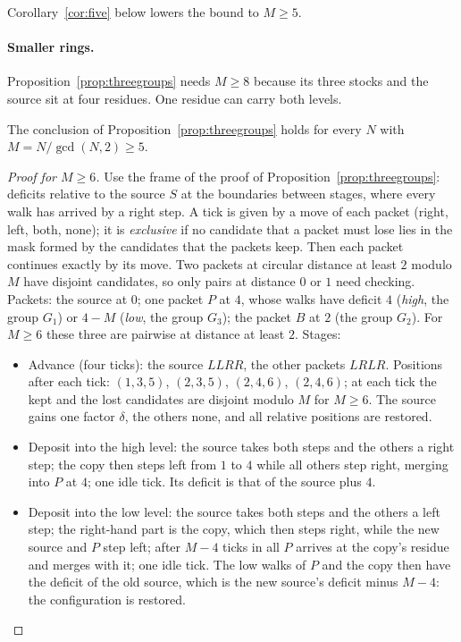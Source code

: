 Corollary~\ref{cor:five} below lowers the bound to $M\ge5$.

\paragraph{Smaller rings.} Proposition~\ref{prop:threegroups} needs $M\ge8$ because its three stocks and the source sit at four residues. One residue can carry both levels.

\begin{proposition}\label{prop:threegroups5}
The conclusion of Proposition~\ref{prop:threegroups} holds for every $N$ with $M=N/\gcd(N,2)\ge5$.
\end{proposition}
\begin{proof}[Proof for $M\ge6$]
Use the frame of the proof of Proposition~\ref{prop:threegroups}: deficits relative to the source $S$ at the boundaries between stages, where every walk has arrived by a right step. A tick is given by a move of each packet (right, left, both, none); it is \emph{exclusive} if no candidate that a packet must lose lies in the mask formed by the candidates that the packets keep. Then each packet continues exactly by its move. Two packets at circular distance at least $2$ modulo $M$ have disjoint candidates, so only pairs at distance $0$ or $1$ need checking. Packets: the source at $0$; one packet $P$ at $4$, whose walks have deficit $4$ (\emph{high}, the group $G_1$) or $4-M$ (\emph{low}, the group $G_3$); the packet $B$ at $2$ (the group $G_2$). For $M\ge6$ these three are pairwise at distance at least $2$. Stages:
\begin{itemize}
\item Advance (four ticks): the source $LLRR$, the other packets $LRLR$. Positions after each tick: $(1,3,5)$, $(2,3,5)$, $(2,4,6)$, $(2,4,6)$; at each tick the kept and the lost candidates are disjoint modulo $M$ for $M\ge6$. The source gains one factor $\delta$, the others none, and all relative positions are restored.
\item Deposit into the high level: the source takes both steps and the others a right step; the copy then steps left from $1$ to $4$ while all others step right, merging into $P$ at $4$; one idle tick. Its deficit is that of the source plus $4$.
\item Deposit into the low level: the source takes both steps and the others a left step; the right-hand part is the copy, which then steps right, while the new source and $P$ step left; after $M-4$ ticks in all $P$ arrives at the copy's residue and merges with it; one idle tick. The low walks of $P$ and the copy then have the deficit of the old source, which is the new source's deficit minus $M-4$: the configuration is restored.

\end{itemize}
\end{proof}
